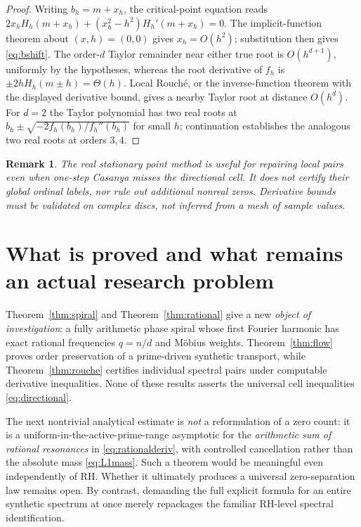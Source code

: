 \documentclass[11pt,a4paper]{article}
\numberwithin{equation}{section}
\newtheorem{remark}[theorem]{Remark}
\begin{document}
\begin{proof}
Writing $b_h=m+x_h$, the critical-point equation reads $2x_h H_h(m+x_h)+(x_h^2-h^2)H_h'(m+x_h)=0$. The implicit-function theorem about $(x,h)=(0,0)$ gives $x_h=O(h^2)$; substitution then gives \eqref{eq:bshift}. The order-$d$ Taylor remainder near either true root is $O(h^{d+1})$, uniformly by the hypotheses, whereas the root derivative of $f_h$ is $\pm2hH_h(m\pm h)=\Theta(h)$. Local Rouch\'e, or the inverse-function theorem with the displayed derivative bound, gives a nearby Taylor root at distance $O(h^d)$. For $d=2$ the Taylor polynomial has two real roots at $b_h\pm\sqrt{-2f_h(b_h)/f_h''(b_h)}$ for small $h$; continuation establishes the analogous two real roots at orders $3,4$.
\end{proof}
\begin{remark}
The real stationary point method is useful for repairing \emph{local pairs} even when one-step Casanya misses the directional cell. It does not certify their global ordinal labels, nor rule out additional nonreal zeros. Derivative bounds must be validated on complex discs, not inferred from a mesh of sample values.
\end{remark}

\section{What is proved and what remains an actual research problem}
Theorem~\ref{thm:spiral} and Theorem~\ref{thm:rational} give a new \emph{object of investigation}: a fully arithmetic phase spiral whose first Fourier harmonic has exact rational frequencies $q=n/d$ and M\"obius weights. Theorem~\ref{thm:flow} proves order preservation of a prime-driven synthetic transport, while Theorem~\ref{thm:rouche} certifies individual spectral pairs under computable derivative inequalities. None of these results asserts the universal cell inequalities \eqref{eq:directional}.

The next nontrivial analytical estimate is \emph{not} a reformulation of a zero count: it is a uniform-in-the-active-prime-range asymptotic for the \emph{arithmetic sum of rational resonances} in \eqref{eq:rationalderiv}, with controlled cancellation rather than the absolute mass \eqref{eq:L1mass}. Such a theorem would be meaningful even independently of RH. Whether it ultimately produces a universal zero-separation law remains open. By contrast, demanding the full explicit formula for an entire synthetic spectrum at once merely repackages the familiar RH-level spectral identification.
\end{document}
